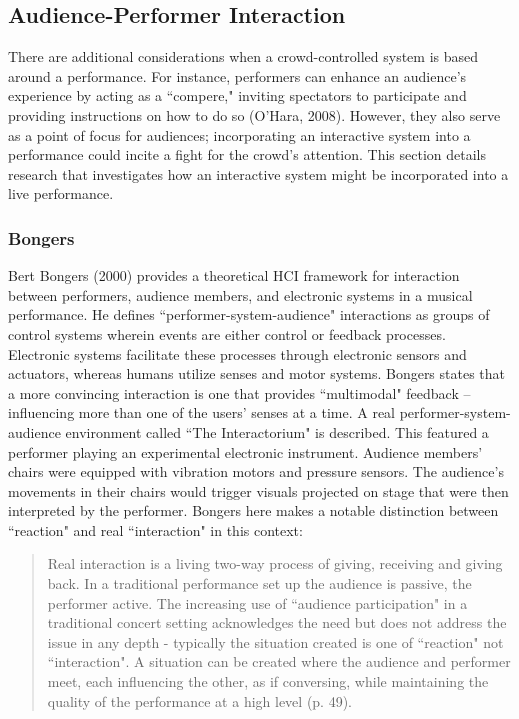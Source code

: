 \subsection{Audience-Performer Interaction}

There are additional considerations when a crowd-controlled system is based around a performance. For instance, performers can enhance an audience's experience by acting as a ``compere," inviting spectators to participate and providing instructions on how to do so (O'Hara, 2008). However, they also serve as a point of focus for audiences; incorporating an interactive system into a performance could incite a fight for the crowd's attention. This section details research that investigates how an interactive system might be incorporated into a live performance.

\subsubsection{Bongers}

Bert Bongers (2000) provides a theoretical HCI framework for interaction between performers, audience members, and electronic systems in a musical performance. He defines ``performer-system-audience" interactions as groups of control systems wherein events are either control or feedback processes. Electronic systems facilitate these processes through electronic sensors and actuators, whereas humans utilize senses and motor systems. Bongers states that a more convincing interaction is one that provides ``multimodal" feedback -- influencing more than one of the users' senses at a time. A real performer-system-audience environment called ``The Interactorium" is described. This featured a performer playing an experimental electronic instrument. Audience members' chairs were equipped with vibration motors and pressure sensors. The audience's movements in their chairs would trigger visuals projected on stage that were then interpreted by the performer. Bongers here makes a notable distinction between ``reaction" and real ``interaction" in this context:

\begin{quotation}
\onehalfspacing	
Real interaction is a living two-way process of giving, receiving and giving back. In a traditional performance set up the audience is passive, the performer active. The increasing use of ``audience participation" in a traditional concert setting acknowledges the need but does not address the issue in any depth - typically the situation created is one of ``reaction" not ``interaction". A situation can be created where the audience and performer meet, each influencing the other, as if conversing, while maintaining the quality of the performance at a high level (p. 49).
\end{quotation}

